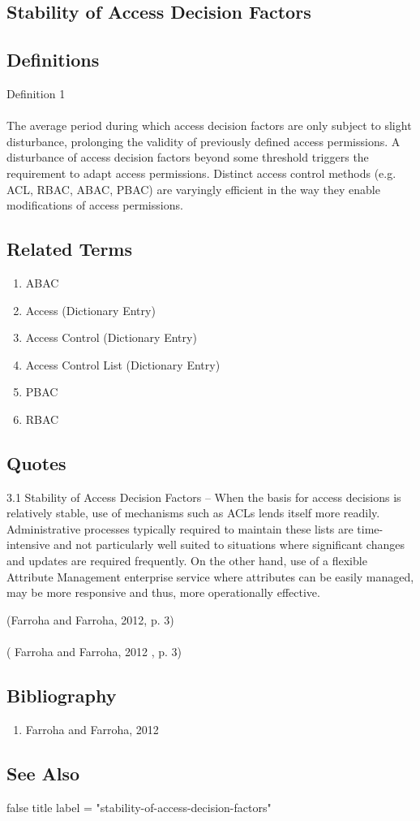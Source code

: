 \newpage \subsection*{Stability of Access Decision Factors } \subsection*{Definitions } \begin{DIC_Def}{Definition 1 }{} \paragraph{} The average period during which access decision factors are only subject to slight disturbance, prolonging the validity of previously defined access permissions. A disturbance of access decision factors beyond some threshold triggers the requirement to adapt access permissions. Distinct access control methods (e.g. ACL, RBAC, ABAC, PBAC) are varyingly efficient in the way they enable modifications of access permissions.  \end{DIC_Def} \subsection*{Related Terms } \begin{enumerate} \item  ABAC  \item  Access (Dictionary Entry)    \item  Access Control (Dictionary Entry)    \item  Access Control List (Dictionary Entry)    \item  PBAC  \item  RBAC  \end{enumerate} \subsection*{Quotes } \begin{DIC_BlockQuote} 3.1 Stability of Access Decision Factors -- When the basis for access decisions is relatively stable, use of mechanisms such as ACLs lends itself more readily. Administrative processes typically required to maintain these lists are time-intensive and not particularly well suited to situations where significant changes and updates are required frequently. On the other hand, use of a flexible Attribute Management enterprise service where attributes can be easily managed, may be more responsive and thus, more operationally effective.  \end{DIC_BlockQuote} (Farroha and Farroha, 2012, p. 3)  \paragraph{} (  Farroha and Farroha, 2012  , p. 3)  \subsection*{Bibliography } \begin{enumerate} \item  Farroha and Farroha, 2012    \end{enumerate} \subsection*{See Also } false  title  label = "stability-of-access-decision-factors"  
